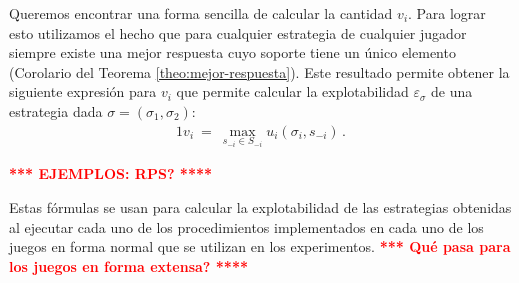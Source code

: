 Queremos encontrar una forma sencilla de calcular la cantidad $v_i$. Para lograr esto utilizamos el hecho que para cualquier estrategia de cualquier jugador siempre existe una mejor respuesta cuyo soporte tiene un único elemento (Corolario del Teorema \ref{theo:mejor-respuesta}). Este resultado permite obtener la siguiente expresión para $v_i$ que permite calcular la explotabilidad $\varepsilon_\sigma$ de una estrategia dada $\sigma=(\sigma_1,\sigma_2)$:
\begin{alignat}{1}
v_i\ =\ \max_{s_{-i} \in S_{-i}} u_i(\sigma_i, s_{-i}) \,.
\end{alignat}

\noindent\textcolor{red}{\bf **** EJEMPLOS: RPS? ****}

Estas fórmulas se usan para calcular la explotabilidad de las estrategias obtenidas al ejecutar cada uno de los procedimientos implementados en cada uno de los juegos en forma normal que se utilizan en los experimentos. \textcolor{red}{\bf **** Qué pasa para los juegos en forma extensa? ****}



